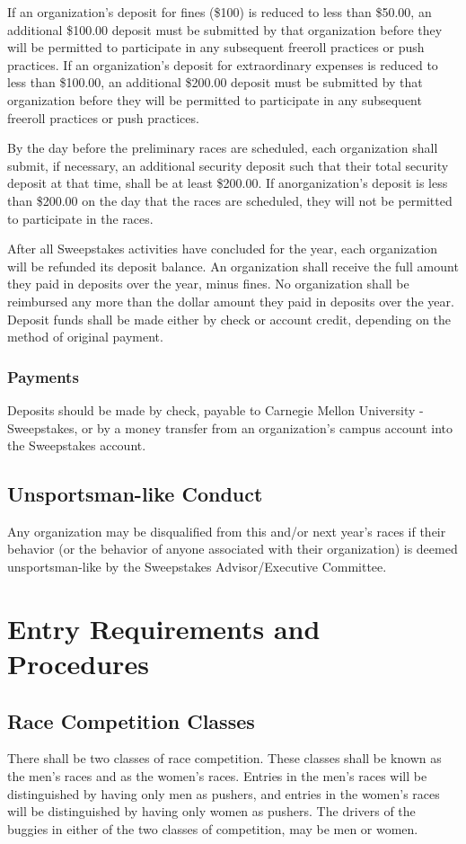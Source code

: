 \documentclass[openany]{book}
\begin{document}
If an organization's deposit for fines (\$100) is reduced to less than \$50.00, an additional \$100.00 deposit must be submitted by that organization before they will be permitted to participate in any subsequent freeroll practices or push practices. If an organization's deposit for extraordinary expenses is reduced to less than \$100.00, an additional \$200.00 deposit must be submitted by that organization before they will be permitted to participate in any subsequent freeroll practices or push practices.

By the day before the preliminary races are scheduled, each organization shall submit, if necessary, an additional security deposit such that their total security deposit at that time, shall be at least \$200.00. If anorganization's deposit is less than \$200.00 on the day that the races are scheduled, they will not be permitted to participate in the races.

After all Sweepstakes activities have concluded for the year, each organization will be refunded its deposit balance. An organization shall receive the full amount they paid in deposits over the year, minus fines. No organization shall be reimbursed any more than the dollar amount they paid in deposits over the year. Deposit funds shall be made either by check or account credit, depending on the method of original payment.

\subsection{Payments}
Deposits should be made by check, payable to Carnegie Mellon University - Sweepstakes, or by a money transfer from an organization's campus account into the Sweepstakes account.

\section{Unsportsman-like Conduct}
Any organization may be disqualified from this and/or next year's races if their behavior (or the behavior of anyone associated with their organization) is deemed unsportsman-like by the Sweepstakes Advisor/Executive Committee.

\chapter{Entry Requirements and Procedures}

\section{Race Competition Classes}
There shall be two classes of race competition. These classes shall be known as the men's races and as the women's races. Entries in the men's races will be distinguished by having only men as pushers, and entries in the women's races will be distinguished by having only women as pushers. The drivers of the buggies in either of the two classes of competition, may be men or women.
\end{document}
